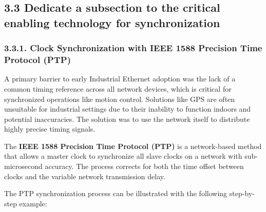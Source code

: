\documentclass[a4paper, 12pt]{book} %
\begin{document}
\subsection{3.3 Dedicate a subsection to the critical enabling
technology for
synchronization}\label{dedicate-a-subsection-to-the-critical-enabling-technology-for-synchronization}

\subsubsection{3.3.1. Clock Synchronization with IEEE 1588 Precision
Time Protocol
(PTP)}\label{clock-synchronization-with-ieee-1588-precision-time-protocol-ptp}

A primary barrier to early Industrial Ethernet adoption was the lack of
a common timing reference across all network devices, which is critical
for synchronized operations like motion control. Solutions like GPS are
often unsuitable for industrial settings due to their inability to
function indoors and potential inaccuracies. The solution was to use the
network itself to distribute highly precise timing signals.

The \textbf{IEEE 1588 Precision Time Protocol (PTP)} is a network-based
method that allows a master clock to synchronize all slave clocks on a
network with sub-microsecond accuracy. The process corrects for both the
time offset between clocks and the variable network transmission delay.

The PTP synchronization process can be illustrated with the following
step-by-step example:
\end{document}
